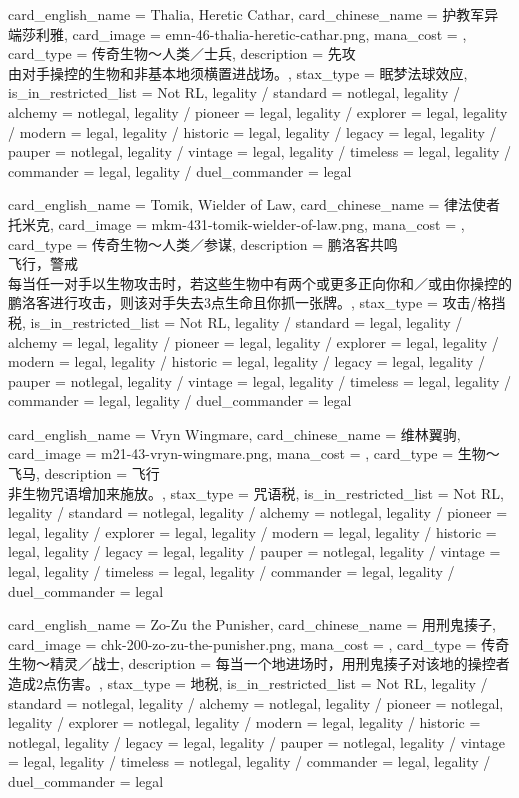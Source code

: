 \documentclass[lang = cn, color = black, 10pt]{AllThatStax}
\begin{document}
\card
{
	card_english_name = {Thalia, Heretic Cathar},
	card_chinese_name = {护教军异端莎利雅},
	card_image = emn-46-thalia-heretic-cathar.png,
	mana_cost = ,
	card_type = 传奇生物～人类／士兵,
	description = {先攻\\
由对手操控的生物和非基本地须横置进战场。},
	stax_type = 眠梦法球效应,
	is_in_restricted_list = Not RL,
	legality / standard = notlegal,
	legality / alchemy = notlegal,
	legality / pioneer = legal,
	legality / explorer = legal,
	legality / modern = legal,
	legality / historic = legal,
	legality / legacy = legal,
	legality / pauper = notlegal,
	legality / vintage = legal,
	legality / timeless = legal,
	legality / commander = legal,
	legality / duel_commander = legal
}

\card
{
	card_english_name = {Tomik, Wielder of Law},
	card_chinese_name = {律法使者托米克},
	card_image = mkm-431-tomik-wielder-of-law.png,
	mana_cost = ,
	card_type = 传奇生物～人类／参谋,
	description = {鹏洛客共鸣\\
飞行，警戒\\
每当任一对手以生物攻击时，若这些生物中有两个或更多正向你和／或由你操控的鹏洛客进行攻击，则该对手失去3点生命且你抓一张牌。},
	stax_type = 攻击/格挡税,
	is_in_restricted_list = Not RL,
	legality / standard = legal,
	legality / alchemy = legal,
	legality / pioneer = legal,
	legality / explorer = legal,
	legality / modern = legal,
	legality / historic = legal,
	legality / legacy = legal,
	legality / pauper = notlegal,
	legality / vintage = legal,
	legality / timeless = legal,
	legality / commander = legal,
	legality / duel_commander = legal
}

\card
{
	card_english_name = {Vryn Wingmare},
	card_chinese_name = {维林翼驹},
	card_image = m21-43-vryn-wingmare.png,
	mana_cost = ,
	card_type = 生物～飞马,
	description = {飞行\\
非生物咒语增加来施放。},
	stax_type = 咒语税,
	is_in_restricted_list = Not RL,
	legality / standard = notlegal,
	legality / alchemy = notlegal,
	legality / pioneer = legal,
	legality / explorer = legal,
	legality / modern = legal,
	legality / historic = legal,
	legality / legacy = legal,
	legality / pauper = notlegal,
	legality / vintage = legal,
	legality / timeless = legal,
	legality / commander = legal,
	legality / duel_commander = legal
}

\card
{
	card_english_name = {Zo-Zu the Punisher},
	card_chinese_name = {用刑鬼揍子},
	card_image = chk-200-zo-zu-the-punisher.png,
	mana_cost = ,
	card_type = 传奇生物～精灵／战士,
	description = {每当一个地进场时，用刑鬼揍子对该地的操控者造成2点伤害。},
	stax_type = 地税,
	is_in_restricted_list = Not RL,
	legality / standard = notlegal,
	legality / alchemy = notlegal,
	legality / pioneer = notlegal,
	legality / explorer = notlegal,
	legality / modern = legal,
	legality / historic = notlegal,
	legality / legacy = legal,
	legality / pauper = notlegal,
	legality / vintage = legal,
	legality / timeless = notlegal,
	legality / commander = legal,
	legality / duel_commander = legal
}
\end{document}
